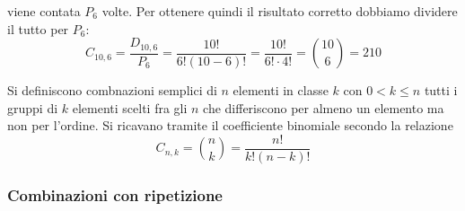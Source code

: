 \documentclass{article}     %
\begin{document}
\begin{ex}
\begin{center}
            \end{center} 
            viene contata $P_6$ volte. Per ottenere quindi il risultato corretto dobbiamo dividere il tutto per $P_6$:
            \[C_{10,6}=\frac{D_{10,6}}{P_6}=\frac{10!}{6!(10-6)!}=\frac{10!}{6!\cdot4!}=\binom{10}{6}=210\]
            \end{ex}
            \begin{boxdef}
                Si definiscono combnazioni semplici di $n$ elementi in classe $k$ con $0<k\leq n$ tutti i gruppi di $k$ elementi scelti fra gli $n$ che differiscono per almeno un elemento ma non per l'ordine. Si ricavano tramite il coefficiente binomiale secondo la relazione \[C_{n,k}=\binom{n}{k}=\frac{n!}{k!(n-k)!}\]
            \end{boxdef}
        \subsubsection{Combinazioni con ripetizione}
\end{document}
